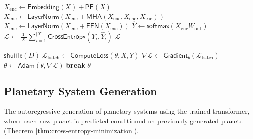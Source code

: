 \documentclass{amsart}
\theoremstyle{break}
\newcommand{\idx}[1]{\index{#1}}
\begin{document}
	\begin{algorithmic}[1]
		
		 
		\State $X_{\text{enc}} \gets \mathsf{Embedding}(X) + \mathsf{PE}(X)$ 
		\State $X_{\text{enc}} \gets \mathsf{LayerNorm}(X_{\text{enc}} + \mathsf{MHA}(X_{\text{enc}}, X_{\text{enc}}, X_{\text{enc}}))$ 
		\State $X_{\text{enc}} \gets \mathsf{LayerNorm}(X_{\text{enc}} + \mathsf{FFN}(X_{\text{enc}}))$ 
		\EndFor
		\State $\hat{Y} \gets \mathsf{softmax}(X_{\text{enc}} W_{\text{out}})$ 
		\State $\mathcal{L} \gets \frac{1}{|X|} \sum_{i=1}^{|X|} \mathsf{CrossEntropy}(Y_i, \hat{Y}_i)$
		\State \Return $\mathcal{L}$
		\EndProcedure
		
		\Statex
		
		 
		 
		\State $\mathsf{shuffle}(D)$
		 
		\State $\mathcal{L}_{\text{batch}} \gets \mathsf{ComputeLoss}(\theta, X, Y)$
		\State $\nabla \mathcal{L} \gets \mathsf{Gradient}_{\theta}(\mathcal{L}_{\text{batch}})$ 
		\State $\theta \gets \mathsf{Adam}(\theta, \nabla \mathcal{L})$ 
		\EndFor
		 
		\State \textbf{break}
		\EndIf
		\EndFor
		\State \Return $\theta$
		\EndProcedure
		
	\end{algorithmic}
	
	\subsection{Planetary System Generation}
	\label{subsec:generation-algorithm}
	\idx{generation algorithm}
	
	The autoregressive generation of planetary systems using the trained transformer, where each new planet is predicted conditioned on previously generated planets (Theorem \ref{thm:cross-entropy-minimization}).
	
\end{document}
